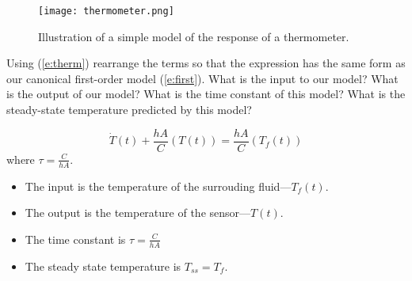 \begin{figure}[hbt]
\centering
\texttt{[image: thermometer.png]}
\caption{Illustration of a simple model of the response of a thermometer.}
\label{f:therm}
\end{figure}

\begin{ex}
Using (\ref{e:therm}) rearrange the terms so that the expression has the same form as our canonical first-order model (\ref{e:first}).    What is the input to our model?  What is the output of our model?  What is the time constant of this model?  What is the steady-state temperature predicted by this model?
\end{ex}

\ifsolutions
\begin{soln}
\[ 
\dot{T}(t)+\frac{hA}{C}(T(t)) = \frac{hA}{C} (T_f(t)) 
\]
where $\tau = \frac{C}{hA}$.
\begin{itemize}
\item The input is the temperature of the surrouding fluid---$T_f(t)$.
\item The output is the temperature of the sensor---$T(t)$.
\item The time constant is $\tau = \frac{C}{hA}$
\item The steady state temperature is $T_{ss}=T_f$.
\end{itemize}
\end{soln}
\fi
